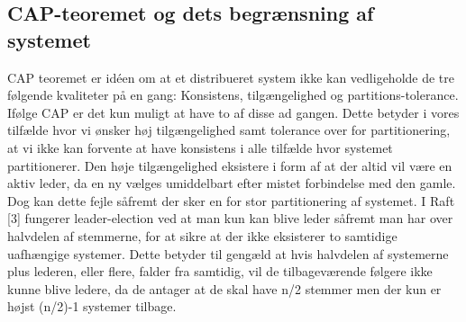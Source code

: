 \documentclass[a4paper,12pt]{article}
\begin{document}
\subsection{CAP-teoremet og dets begrænsning af systemet}
CAP teoremet er idéen om at et distribueret system ikke kan vedligeholde de tre følgende kvaliteter på en gang: Konsistens, tilgængelighed og partitions-tolerance. Ifølge CAP er det kun muligt at have to af disse ad gangen. Dette betyder i vores tilfælde hvor vi ønsker høj tilgængelighed samt tolerance over for partitionering, at vi ikke kan forvente at have konsistens i alle tilfælde hvor systemet partitionerer.
Den høje tilgængelighed eksistere i form af at der altid vil være en aktiv leder, da en ny vælges umiddelbart efter mistet forbindelse med den gamle.
\\
Dog kan dette fejle såfremt der sker en for stor partitionering af systemet. 
I Raft [3] fungerer leader-election ved at man kun kan blive leder såfremt man har over halvdelen af stemmerne, for at sikre at der ikke eksisterer to samtidige uafhængige systemer. Dette betyder til gengæld at hvis halvdelen af systemerne plus lederen, eller flere, falder fra samtidig, vil de tilbageværende følgere ikke kunne blive ledere, da de antager at de skal have n/2 stemmer men der kun er højst (n/2)-1 systemer tilbage. 
\end{document}
